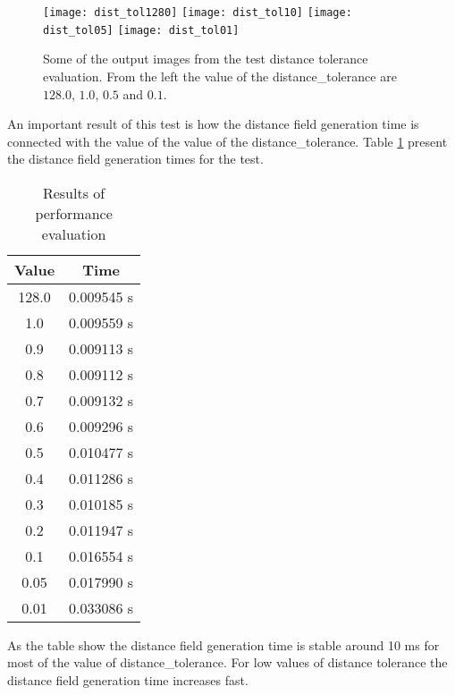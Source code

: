 \begin{figure}[H]
  \texttt{[image: dist\_tol1280]}
\endminipage\hfill
{}
  \texttt{[image: dist\_tol10]}
\endminipage\hfill
{}
  \texttt{[image: dist\_tol05]}
\endminipage\hfill
{}
  \texttt{[image: dist\_tol01]}
\endminipage\hfill
\caption{Some of the output images from the test distance tolerance evaluation. From the left the value of the distance\_tolerance are $128.0$, $1.0$, $0.5$ and $0.1$.}\label{fig:disttolout}
\end{figure} 

An important result of this test is how the distance field generation time is connected with the value of the value of the distance\_tolerance. Table \ref{table:dist_tol} present the distance field generation times for the test.

\begin{table}[H]
\caption{Results of performance evaluation}
\centering
\begin{tabular}{c c}
\hline
\hline %
Value & Time\\ [0.5ex] %
\hline
128.0 	&	0.009545 s  \\
1.0 	&	0.009559 s  \\
0.9 	&	0.009113 s  \\
0.8 	&	0.009112 s  \\
0.7 	&	0.009132 s  \\
0.6 	&	0.009296 s  \\
0.5 	&	0.010477 s  \\
0.4 	&	0.011286 s  \\
0.3 	&	0.010185 s  \\
0.2 	&	0.011947 s  \\
0.1 	&	0.016554 s  \\
0.05 	&	0.017990 s  \\
0.01 	&	0.033086 s  \\ [1ex]
\hline
\end{tabular}
\label{table:dist_tol}
\end{table}

As the table show the distance field generation time is stable around 10 ms for most of the value of distance\_tolerance. For low values of distance tolerance the distance field generation time increases fast.